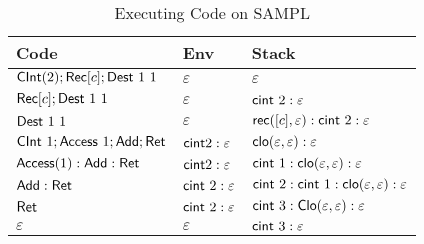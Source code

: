 \documentclass[11pt]{article}
\newcommand{\<}{\langle}
\renewcommand{\>}{\rangle}
\begin{document}
  \begin{table}[!h]
  \begin{center}
    \begin{tabular}{|l|l|l|}
    \hline
   Code                          & Env                     & Stack                                                    \\ \hline
     ${\sf CInt}(2) ; {\sf Rec}[c];{\sf Dest}~1~1$      & $\varepsilon$   & $\varepsilon$                                    \\ \hline
    ${\sf Rec}[c];{\sf Dest}~1~1$             & $\varepsilon$  & ${\sf cint}~2:\varepsilon$  \\ \hline
     ${\sf Dest}~1 ~1$     & $\varepsilon$   & ${\sf rec}([c],\varepsilon): {\sf cint}~2:\varepsilon$ \\ \hline
     ${\sf CInt}~1; {\sf Access}~1; {\sf Add}; {\sf Ret}$ & ${\sf cint} 2:\varepsilon$ & ${\sf clo}(\varepsilon,\varepsilon):\varepsilon$                                   \\ \hline
     ${\sf Access}(1): {\sf Add}: {\sf Ret}$           & ${\sf cint} 2:\varepsilon$ & ${\sf cint}~1:{\sf clo}(\varepsilon,\varepsilon):\varepsilon$                                                        \\ \hline
    ${\sf Add}: {\sf Ret}$                  & ${\sf cint}~2:\varepsilon$ & ${\sf cint}~2:{\sf cint}~1:{\sf clo}(\varepsilon,\varepsilon):\varepsilon$                                                     \\ \hline
      ${\sf Ret}$                        & ${\sf cint}~2:\varepsilon$ & ${\sf cint}~3:{\sf Clo}(\varepsilon,\varepsilon):\varepsilon$                                                       \\ \hline
    $\varepsilon$                     & $\varepsilon$   & ${\sf cint}~3:\varepsilon$                                                        \\ \hline
    \end{tabular}
    \caption{Executing Code on SAMPL}
    \label{AMPL:ExecSeqTable}
    \end{center}
    \end{table}
\end{document}
